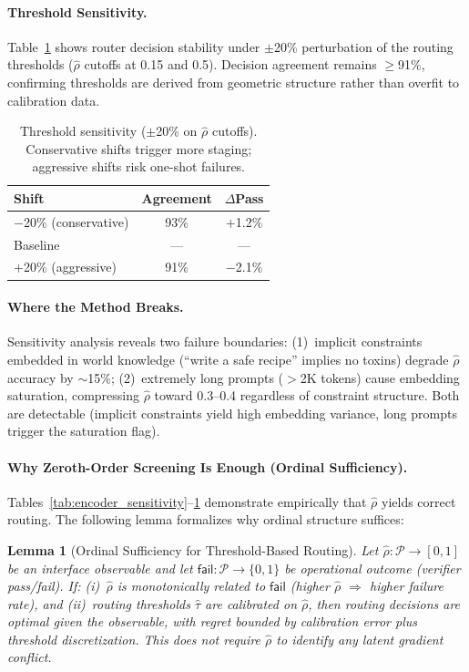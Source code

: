 \documentclass{article}
\theoremstyle{plain}
\newtheorem{lemma}[theorem]{Lemma}
\theoremstyle{definition}
\theoremstyle{remark}
\newcommand{\rhohat}{\hat{\rho}}
\begin{document}
\paragraph{Threshold Sensitivity.}
Table~\ref{tab:threshold_sensitivity} shows router decision stability under $\pm$20\% perturbation of the routing thresholds ($\rhohat$ cutoffs at 0.15 and 0.5). Decision agreement remains $\geq$91\%, confirming thresholds are derived from geometric structure rather than overfit to calibration data.

\begin{table}[ht]
\centering
\footnotesize
\caption{Threshold sensitivity ($\pm$20\% on $\rhohat$ cutoffs). Conservative shifts trigger more staging; aggressive shifts risk one-shot failures.}
\label{tab:threshold_sensitivity}
\begin{tabular}{lcc}
\toprule
Shift & Agreement & $\Delta$Pass \\
\midrule
$-$20\% (conservative) & 93\% & $+$1.2\% \\
Baseline & --- & --- \\
$+$20\% (aggressive) & 91\% & $-$2.1\% \\
\bottomrule
\end{tabular}
\end{table}

\paragraph{Where the Method Breaks.}
Sensitivity analysis reveals two failure boundaries: (1)~implicit constraints embedded in world knowledge (``write a safe recipe'' implies no toxins) degrade $\rhohat$ accuracy by $\sim$15\%; (2)~extremely long prompts ($>$2K tokens) cause embedding saturation, compressing $\rhohat$ toward 0.3--0.4 regardless of constraint structure. Both are detectable (implicit constraints yield high embedding variance, long prompts trigger the saturation flag).

\paragraph{Why Zeroth-Order Screening Is Enough (Ordinal Sufficiency).}
Tables~\ref{tab:encoder_sensitivity}--\ref{tab:threshold_sensitivity} demonstrate empirically that $\rhohat$ yields correct routing. The following lemma formalizes why ordinal structure suffices:

\begin{lemma}[Ordinal Sufficiency for Threshold-Based Routing]\label{lem:proxy_sufficiency}
Let $\rhohat: \mathcal{P} \to [0,1]$ be an interface observable and let $\mathsf{fail}: \mathcal{P} \to \{0,1\}$ be operational outcome (verifier pass/fail). If: (i)~$\rhohat$ is monotonically related to $\mathsf{fail}$ (higher $\rhohat$ $\Rightarrow$ higher failure rate), and (ii)~routing thresholds $\hat{\tau}$ are calibrated on $\rhohat$, then routing decisions are optimal given the observable, with regret bounded by calibration error plus threshold discretization. This does not require $\rhohat$ to identify any latent gradient conflict.
\end{lemma}
\end{document}
